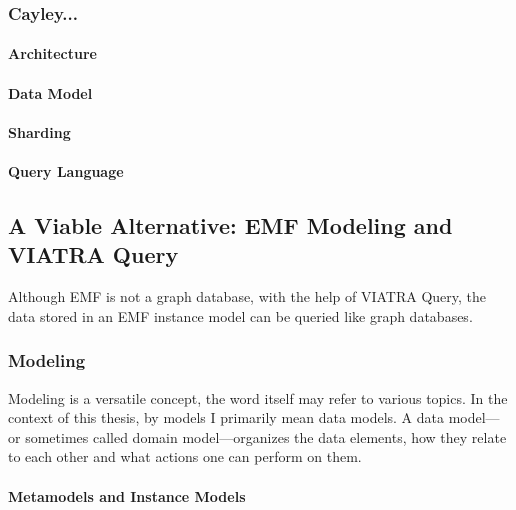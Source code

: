 \subsubsection{Cayley...}
\paragraph{Architecture}
\paragraph{Data Model}
\paragraph{Sharding}
\paragraph{Query Language}

\subsection{A Viable Alternative: EMF Modeling and VIATRA Query}
Although EMF is not a graph database, with the help of VIATRA Query, the data stored in an EMF instance model can be queried like graph databases.

\subsubsection{Modeling}
Modeling is a versatile concept, the word itself may refer to various topics. In the context of this thesis, by models I primarily mean data models. A data model---or sometimes called domain model---organizes the data elements, how they relate to each other and what actions one can perform on them.

\paragraph{Metamodels and Instance Models}

